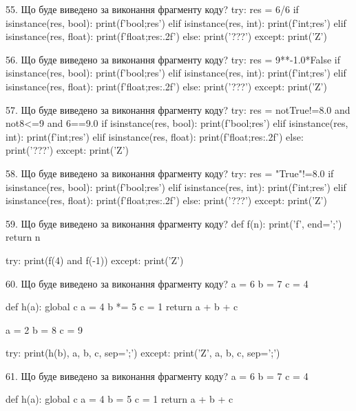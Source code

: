 \documentclass[11pt]{article}
\begin{document}
55. Що буде виведено за виконання фрагменту коду?
try:
    res = 6/6%
    if isinstance(res, bool):
        print(f'bool;{res}')
    elif isinstance(res, int):
        print(f'int;{res}')
    elif isinstance(res, float):
        print(f'float;{res:.2f}')
    else:
        print('???')
except:
    print('Z')


56. Що буде виведено за виконання фрагменту коду?
try:
    res = 9**-1.0*False
    if isinstance(res, bool):
        print(f'bool;{res}')
    elif isinstance(res, int):
        print(f'int;{res}')
    elif isinstance(res, float):
        print(f'float;{res:.2f}')
    else:
        print('???')
except:
    print('Z')


57. Що буде виведено за виконання фрагменту коду?
try:
    res = notTrue!=8.0 and not8<=9 and 6==9.0
    if isinstance(res, bool):
        print(f'bool;{res}')
    elif isinstance(res, int):
        print(f'int;{res}')
    elif isinstance(res, float):
        print(f'float;{res:.2f}')
    else:
        print('???')
except:
    print('Z')


58. Що буде виведено за виконання фрагменту коду?
try:
    res = "True"!=8.0
    if isinstance(res, bool):
        print(f'bool;{res}')
    elif isinstance(res, int):
        print(f'int;{res}')
    elif isinstance(res, float):
        print(f'float;{res:.2f}')
    else:
        print('???')
except:
    print('Z')


59. Що буде виведено за виконання фрагменту коду?
def f(n):
    print('f', end=';')
    return n

try:
    print(f(4) and f(-1))
except:
    print('Z')


60. Що буде виведено за виконання фрагменту коду?
a = 6
b = 7
c = 4

def h(a):
global c    a = 4
    b *= 5
    c = 1
    return a + b + c

a = 2
b = 8
c = 9

try:
    print(h(b), a, b, c, sep=';')
except:
    print('Z', a, b, c, sep=';')


61. Що буде виведено за виконання фрагменту коду?
a = 6
b = 7
c = 4

def h(a):
global c    a = 4
    b = 5
    c = 1
    return a + b + c
\end{document}
